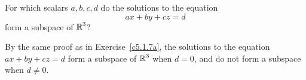 \documentclass{ximera}
\begin{document}
\begin{exercise} \label{c5.1.7b}
For which scalars $a,b,c,d$ do the solutions to the equation
\[
ax+by+cz = d
\]
form a subspace of $\mbox{$\Bbb{R}$}^3$?

\begin{solution}

\ans By the same proof as in Exercise~\ref{c5.1.7a}, the solutions to the
equation $ax + by + cz = d$ form a subspace of $\mbox{$\Bbb{R}$}^3$ when $d = 0$,
and do not form a subspace when $d \neq 0$.

\end{solution}
\end{exercise}
\end{document}
